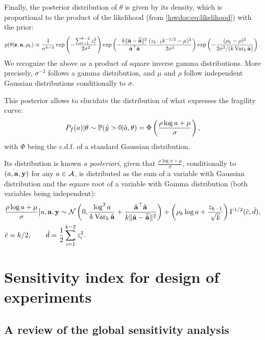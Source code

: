 Finally, the posterior distribution of $\theta$ is given by its density, which is proportional to the product of the likelihood (from \cref{lowdoe:eq:likelihood}) with the prior:
    \begin{equation}\label{lowdoe:eq:posterior}
        p(\theta|\mathbf{z}, \mathbf{a},\rho_k) \propto \frac{1}{\sigma^{k+3}} \exp\left({-\frac{\sum_{i=1}^{k-2}z_i^2}{2\sigma^2}}\right) \exp\left({-\frac{k\|\hat{\mathbf{a}}-\overline{\hat{\mathbf{a}}}\|^2}{\hat{\mathbf{a}}^{\top}\hat{\mathbf{a}}}\frac{(z_{k-1}k^{-1/2}-\mu)^2}{2\sigma^2}}\right)
            \exp\left({-\frac{(\rho_k-\rho)^2}{2\sigma^2/(k\operatorname{Var}_k\hat{\mathbf{a}})}}\right).
    \end{equation}
We recognize the above as a product of square inverse gamma distributions. More precisely, $\sigma^{-2}$ follows a gamma distribution, and $\mu$ and $\rho$ follow independent Gaussian distributions conditionally to $\sigma$.

This posterior allows to elucidate the distribution of what expresses the fragility curve: 
\begin{equation}
    P_f(a)|\theta \sim \mathbb{P}( \hat y>0|\hat a,\theta) = \Phi\left(\frac{\rho\log a+\mu}{\sigma}\right) ,
\end{equation}
with $\Phi$ being the c.d.f. of a standard Gaussian distribution.

Its distribution is known \emph{a posteriori}, given that
$\frac{\rho\log a+\mu}{\sigma}$, conditionally to $(a,\mathbf{a},\mathbf{y})$ for any $a\in\mathcal{A}$, is distributed as the sum
of a variable with Gaussian distribution and the square root of a variable with Gamma distribution (both variables being independent):
\begin{align}
    &\frac{\rho\log a+\mu}{\sigma}\big| a,\mathbf{a},\mathbf{y} \sim \mathcal{N}\left(0,\frac{\log^2 a}{k\operatorname{Var}_k\hat{\mathbf{a}}} + \frac{\hat{\mathbf{a}}^{\top}\hat{\mathbf{a}}}{k\|\hat{\mathbf{a}} -\overline{\hat{\mathbf{a}}}\|^2} \right) + \left(\rho_k\log a + \frac{z_{k-1}}{\sqrt{k}}\right)\Gamma^{1/2}(\tilde c,\tilde d) \label{lowdoe:eq:apostcf} , \\
    &\tilde c = k/2, \qquad \tilde d = \frac{1}{2}\sum_{i=1}^{k-2}z_i^2.
\end{align}



\section{Sensitivity index for design of experiments}\label{lowdoe:sec:PE}

\subsection{A review of the global sensitivity analysis}

